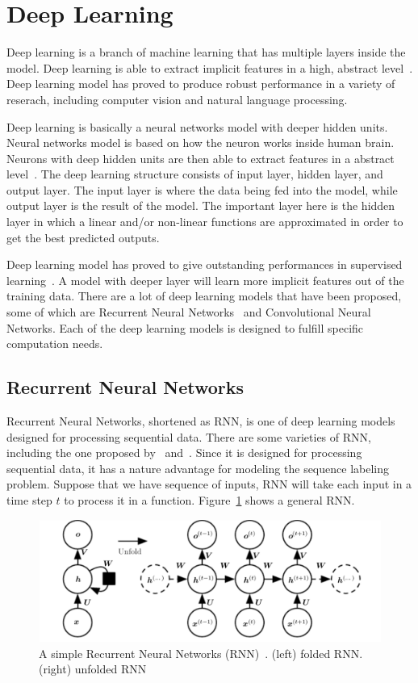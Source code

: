 \section{Deep Learning}
Deep learning is a branch of machine learning that has multiple layers inside the model. Deep learning is able to extract implicit features in a high, abstract level~\citep{lecun2015deep}. Deep learning model has proved to produce robust performance in a variety of reserach, including computer vision and natural language processing.

Deep learning is basically a neural networks model with deeper hidden units. Neural networks model is based on how the neuron works inside human brain. Neurons with deep hidden units are then able to extract features in a abstract level~\citep{bengio2007scaling}. The deep learning structure consists of input layer, hidden layer, and output layer. The input layer is where the data being fed into the model, while output layer is the result of the model. The important layer here is the hidden layer in which a linear and/or non-linear functions are approximated in order to get the best predicted outputs.

Deep learning model has proved to give outstanding performances in supervised learning~\citep{Goodfellow-et-al-2016-Book}. A model with deeper layer will learn more implicit features out of the training data. There are a lot of deep learning models that have been proposed, some of which are Recurrent Neural Networks~\citep{elman1990finding} and Convolutional Neural Networks. Each of the deep learning models is designed to fulfill specific computation needs.

\subsection{Recurrent Neural Networks}
Recurrent Neural Networks, shortened as RNN, is one of deep learning models designed for processing sequential data. There are some varieties of RNN, including the one proposed by~\cite{elman1990finding} and~\cite{jordan1986attractor}. Since it is designed for processing sequential data, it has a nature advantage for modeling the sequence labeling problem. Suppose that we have sequence of inputs, RNN will take each input in a time step $t$ to process it in a function. Figure~\ref{fig:simplernn} shows a general RNN.

\begin{figure}
	\centering
	\includegraphics[width=0.80\linewidth]{images/simplernn}
	\caption{A simple Recurrent Neural Networks (RNN)~\citep{Goodfellow-et-al-2016-Book}. (left) folded RNN. (right) unfolded RNN}
	\label{fig:simplernn}
\end{figure}

